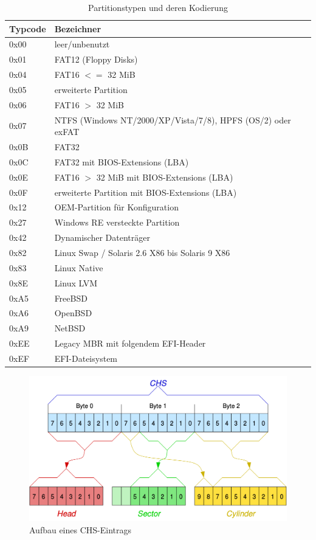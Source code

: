 \documentclass[11pt,a4paper]{article}
\begin{document}
\begin{table}[h]
	\begin{center}
		\begin{tabular}[c]{ l | l }
		\cellcolor{grey} Typcode & \cellcolor{grey} Bezeichner \\ \hline
		0x00 & leer/unbenutzt \\ \hline
		0x01 & FAT12 (Floppy Disks) \\ \hline
		0x04 & FAT16 \(<=\) 32 MiB \\ \hline
		0x05 & erweiterte Partition \\ \hline
		0x06 & FAT16 \(>\) 32 MiB \\ \hline
		0x07 & NTFS (Windows NT/2000/XP/Vista/7/8), HPFS (OS/2) oder exFAT \\ \hline
		0x0B & FAT32 \\ \hline
		0x0C & FAT32 mit BIOS-Extensions (LBA) \\ \hline
		0x0E & FAT16 \(>\) 32 MiB mit BIOS-Extensions (LBA) \\ \hline
		0x0F & erweiterte Partition mit BIOS-Extensions (LBA) \\ \hline
		0x12 & OEM-Partition für Konfiguration \\ \hline
		0x27 & Windows RE versteckte Partition \\ \hline
		0x42 & Dynamischer Datenträger \\ \hline
		0x82 & Linux Swap / Solaris 2.6 X86 bis Solaris 9 X86 \\ \hline
		0x83 & Linux Native \\ \hline
		0x8E & Linux LVM \\ \hline
		0xA5 & FreeBSD \\ \hline
		0xA6 & OpenBSD \\ \hline
		0xA9 & NetBSD \\ \hline
		0xEE & Legacy MBR mit folgendem EFI-Header \\ \hline
		0xEF & EFI-Dateisystem \\ 
		\end{tabular}
	\end{center}
	
	\caption{Partitionstypen und deren Kodierung}
	\label{tab:mbr_parttype}
\end{table}

\begin{figure}[h]
	\centering
	\includegraphics[scale=0.3]{images/chs_entry.png}
	\caption{Aufbau eines CHS-Eintrags}
	\label{fig:mbr_chsentry}
\end{figure}
\pagebreak{}
\end{document}
